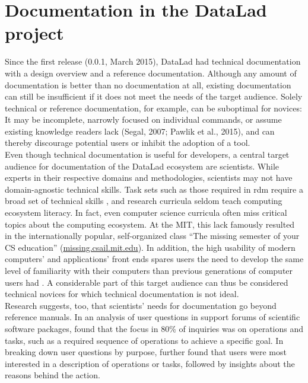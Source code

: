 

\section{Documentation in the DataLad project}

Since the first release (0.0.1, March 2015), DataLad had technical documentation with a design overview and a reference documentation.
Although any amount of documentation is better than no documentation at all, existing documentation can still be insufficient if it does not meet the needs of the target audience.
Solely technical or reference documentation, for example, can be suboptimal for novices: It may be incomplete, narrowly focused on individual commands, or assume existing knowledge readers lack (Segal, 2007; Pawlik et al., 2015), and can thereby discourage potential users or inhibit the adoption of a tool.\\
Even though technical documentation is useful for developers, a central target audience for documentation of the DataLad ecosystem are scientists.
While experts in their respective domains and methodologies, scientists may not have domain-agnostic technical skills.
Task sets such as those required in \gls{rdm} require a broad set of technical skills \citep{grisham2016proposed}, and research curricula seldom teach computing ecosystem literacy.
In fact, even computer science curricula often miss critical topics about the computing ecosystem.
At the \gls{MIT}, this lack famously resulted in the internationally popular, self-organized class ``The missing semester of your CS education'' (\href{https://missing.csail.mit.edu/about/}{missing.csail.mit.edu}).
In addition, the high usability of modern computers' and applications' front ends spares users the need to develop the same level of familiarity with their computers than previous generations of computer users had \citep{mehlenbacher2003documentation}.
A considerable part of this target audience can thus be considered technical novices for which technical documentation is not ideal. \\
Research suggests, too, that scientists' needs for documentation go beyond reference manuals.
In an analysis of user questions in support forums of scientific software packages, \citet{swarts2019open} found that the focus in 80\% of inquiries was on operations and tasks, such as a required sequence of operations to achieve a specific goal.
In breaking down user questions by purpose, \citet{swarts2019open} further found that users were most interested in a description of operations or tasks, followed by insights about the reasons behind the action.
